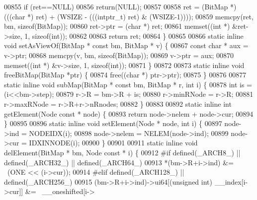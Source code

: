 \begin{DoxyCode}
00855         \textcolor{keywordflow}{if} (ret==NULL)
00856                 \textcolor{keywordflow}{return}(NULL);
00857 
00858         ret =  (BitMap *) (((\textcolor{keywordtype}{char} *) ret) + (WSIZE - (((intptr\_t) ret) & (WSIZE-1))));
00859         memcpy(ret, bm, \textcolor{keyword}{sizeof}(BitMap));
00860         ret->ptr = (\textcolor{keywordtype}{char} *) ret;
00861         memset((\textcolor{keywordtype}{int} *) &ret->size, 1, \textcolor{keyword}{sizeof}(\textcolor{keywordtype}{int}));
00862 
00863         \textcolor{keywordflow}{return} ret;
00864 \}
00865 
00866 \textcolor{keyword}{static} \textcolor{keyword}{inline} \textcolor{keywordtype}{void} setAsViewOf(BitMap * \textcolor{keyword}{const} bm, BitMap * v) \{
00867         \textcolor{keyword}{const} \textcolor{keywordtype}{char} * aux = v->ptr;
00868         memcpy(v, bm, \textcolor{keyword}{sizeof}(BitMap));
00869         v->ptr = aux;
00870         memset((\textcolor{keywordtype}{int} *) &v->size, 1, \textcolor{keyword}{sizeof}(\textcolor{keywordtype}{int}));
00871 \}
00872 
00873 \textcolor{keyword}{static} \textcolor{keyword}{inline} \textcolor{keywordtype}{void} freeBitMap(BitMap *ptr) \{
00874         free((\textcolor{keywordtype}{char} *) ptr->ptr);
00875 \}
00876 
00877 \textcolor{keyword}{static} \textcolor{keyword}{inline} \textcolor{keywordtype}{void} subMap(BitMap * \textcolor{keyword}{const} bm, BitMap * r, \textcolor{keywordtype}{int} i) \{
00878         \textcolor{keywordtype}{int} is = (i<<bm->step);
00879         r->R = bm->R + is;
00880         r->minRNode = r->R;
00881         r->maxRNode = r->R+r->nRnodes;
00882 \}
00883 
00892 \textcolor{keyword}{static} \textcolor{keyword}{inline} \textcolor{keywordtype}{int} getElement(Node \textcolor{keyword}{const} * node) \{
00893         \textcolor{keywordflow}{return} node->nelem + node->cur;
00894 \}
00895 
00896 \textcolor{keyword}{static} \textcolor{keyword}{inline} \textcolor{keywordtype}{void} setElement(Node * node, \textcolor{keywordtype}{int} i) \{
00897         node->ind = NODEIDX(i);
00898         node->nelem = NELEM(node->ind);
00899         node->cur = IDXINNODE(i);
00900 \}
00901 
00911 \textcolor{keyword}{static} \textcolor{keyword}{inline} \textcolor{keywordtype}{void} delElement(BitMap * bm, Node \textcolor{keyword}{const} * i) \{
00912 \textcolor{preprocessor}{#if defined(\_ARCH8\_) || defined(\_ARCH32\_) || defined(\_ARCH64\_)}
00913         *(bm->R+i->ind) &= ~(ONE << (i->cur));
00914 \textcolor{preprocessor}{#elif defined(\_ARCH128\_) || defined(\_ARCH256\_)}
00915         (bm->R+i->ind)->ui64[(\textcolor{keywordtype}{unsigned} \textcolor{keywordtype}{int}) \_\_index[i->cur]] &= ~\_\_oneshifted[i->

\end{DoxyCode}
